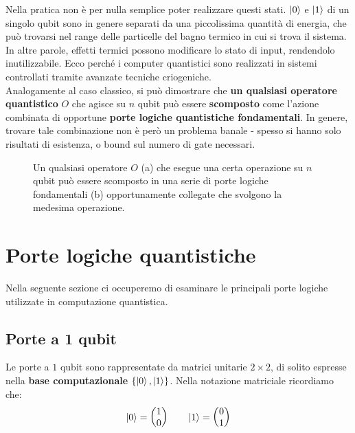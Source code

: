 \documentclass[../../InformazioneQuantistica.tex]{subfiles}
\begin{document}
Nella pratica non è per nulla semplice poter realizzare questi stati. $\Ket{0}$ e $\Ket{1}$ di un singolo qubit sono in genere separati da una piccolissima quantità di energia, che può trovarsi nel range delle particelle del bagno termico in cui si trova il sistema. In altre parole, effetti termici possono modificare lo stato di input, rendendolo inutilizzabile. Ecco perché i computer quantistici sono realizzati in sistemi controllati tramite avanzate tecniche criogeniche.\\

Analogamente al caso classico, si può dimostrare che \textbf{un qualsiasi operatore quantistico} $O$ che agisce su $n$ qubit può essere\textbf{ scomposto} come l'azione combinata di opportune \textbf{porte logiche quantistiche fondamentali}. In genere, trovare tale combinazione non è però un problema banale - spesso si hanno solo risultati di esistenza, o bound sul numero di gate necessari.

\begin{figure}[H]
\centering

\caption{Un qualsiasi operatore $O$ (a) che esegue una certa operazione su $n$ qubit può essere scomposto in  una serie di porte logiche fondamentali (b) opportunamente collegate che svolgono la medesima operazione.\label{fig:scomposizione-porte-logiche}}
\end{figure}

\section{Porte logiche quantistiche}
Nella seguente sezione ci occuperemo di esaminare le principali porte logiche utilizzate in computazione quantistica.

\subsection{Porte a 1 qubit}
Le porte a $1$ qubit sono rappresentate da matrici unitarie $2\times 2$, di solito espresse nella \textbf{base computazionale} $\{\Ket{0}, \Ket{1}\}$. Nella notazione matriciale ricordiamo che:
\begin{align*}
\Ket{0} = \begin{pmatrix} 1 \\ 0 \end{pmatrix} \qquad \Ket{1} = \begin{pmatrix} 0 \\ 1 \end{pmatrix}
\end{align*}
\end{document}
